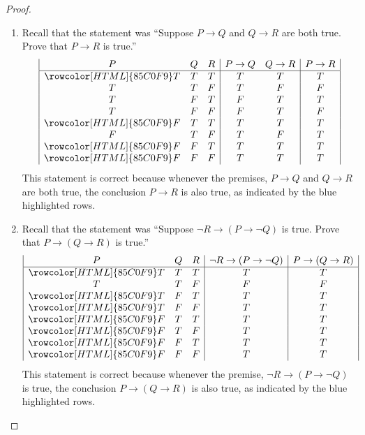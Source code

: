 \documentclass[12pt]{amsart}
\theoremstyle{definition}
\theoremstyle{remark}
\begin{document}
\begin{proof}
\hfill
\begin{enumerate}
	\item Recall that the statement was 
	``Suppose $P \rightarrow Q$ and $Q \rightarrow R$ are both true.
	Prove that $P \rightarrow R$ is true.''
	\begin{equation*}
		\begin{array}{| c c c | c  c | c |}
		P & Q & R & P \rightarrow Q &  Q \rightarrow R & P \rightarrow R\\
		\hline
		\rowcolor[HTML]{85C0F9} T & T & T & T & T & T \\
		T & T & F & T & F & F \\
		T & F & T & F & T & T \\
		T & F & F & F & T & F \\
		\rowcolor[HTML]{85C0F9} F & T & T & T & T & T \\
		F & T & F & T & F & T \\
		\rowcolor[HTML]{85C0F9} F & F & T & T & T & T \\
		\rowcolor[HTML]{85C0F9} F & F & F & T & T & T \\
		\end{array}
	\end{equation*}
	This statement is correct because whenever the premises, $P \rightarrow Q$ and
	$Q \rightarrow R$ are both true, the conclusion $P \rightarrow R$ is also true,
	as indicated by the blue highlighted rows.
	
	\item Recall that the statement was 
	``Suppose $\neg R \rightarrow (P \rightarrow \neg Q)$ is true.
	Prove that $P \rightarrow (Q \rightarrow R)$ is true.''
	\begin{equation*}
		\begin{array}{| c c c | c | c |}
			P & Q & R & \neg R \rightarrow (P \rightarrow \neg Q)
				& P \rightarrow (Q \rightarrow R) \\
			\hline
			\rowcolor[HTML]{85C0F9} T & T & T & T & T \\
			T & T & F & F & F \\
			\rowcolor[HTML]{85C0F9} T & F & T & T & T \\
			\rowcolor[HTML]{85C0F9} T & F & F & T & T \\
			\rowcolor[HTML]{85C0F9} F & T & T & T & T \\
			\rowcolor[HTML]{85C0F9} F & T & F & T & T \\
			\rowcolor[HTML]{85C0F9} F & F & T & T & T \\
			\rowcolor[HTML]{85C0F9} F & F & F & T & T \\
		\end{array}
	\end{equation*}
	This statement is correct because whenever the premise, 
	$\neg R \rightarrow (P \rightarrow \neg Q)$ is true, the conclusion 
	$P \rightarrow (Q \rightarrow R)$ is also true, as indicated by the blue highlighted rows.
	

\end{enumerate}
\end{proof}
\end{document}

